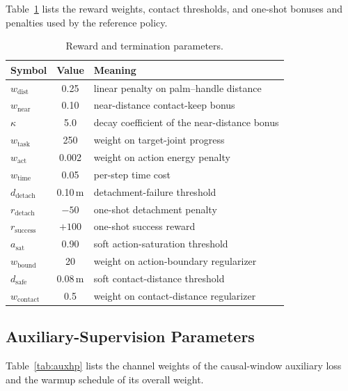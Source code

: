 \documentclass{llmxive}
\begin{document}
Table~\ref{tab:rewhp} lists the reward weights, contact thresholds, and
one-shot bonuses and penalties used by the reference policy.

\begin{table}[ht]
\centering
\small
\begin{tabular}{lcl}
\toprule
Symbol & Value & Meaning \\
\midrule
$w_{\mathrm{dist}}$    & 0.25      & linear penalty on palm--handle distance \\
$w_{\mathrm{near}}$    & 0.10      & near-distance contact-keep bonus \\
$\kappa$               & 5.0       & decay coefficient of the near-distance bonus \\
$w_{\mathrm{task}}$    & 250       & weight on target-joint progress \\
$w_{\mathrm{act}}$     & 0.002     & weight on action energy penalty \\
$w_{\mathrm{time}}$    & 0.05      & per-step time cost \\
$d_{\mathrm{detach}}$  & 0.10\,m   & detachment-failure threshold \\
$r_{\mathrm{detach}}$  & $-50$     & one-shot detachment penalty \\
$r_{\mathrm{success}}$ & $+100$    & one-shot success reward \\
$a_{\mathrm{sat}}$     & 0.90      & soft action-saturation threshold \\
$w_{\mathrm{bound}}$   & 20        & weight on action-boundary regularizer \\
$d_{\mathrm{safe}}$    & 0.08\,m   & soft contact-distance threshold \\
$w_{\mathrm{contact}}$ & 0.5       & weight on contact-distance regularizer \\
\bottomrule
\end{tabular}
\caption{Reward and termination parameters.}
\label{tab:rewhp}
\end{table}


\subsection{Auxiliary-Supervision Parameters}
\label{app:auxhp}

Table~\ref{tab:auxhp} lists the channel weights of the causal-window
auxiliary loss and the warmup schedule of its overall weight.
\end{document}
